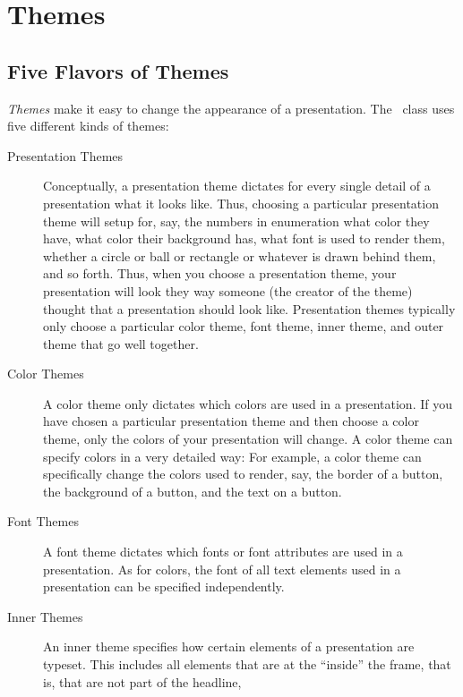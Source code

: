 
%


\section{Themes}


\subsection{Five Flavors of Themes}

\emph{Themes} make it easy to change the appearance of a
presentation. The \beamer\ class uses five different kinds of themes:
\begin{description}
\item[Presentation Themes]
  Conceptually, a presentation theme dictates for every single detail
  of a presentation what it looks like. Thus, choosing a particular
  presentation theme will setup for, say, the numbers in enumeration
  what color they have, what color their background has, what font is
  used to render them, whether a circle or ball or rectangle or
  whatever is drawn behind them, and so forth. Thus, when you choose
  a presentation theme, your presentation will look they way someone
  (the creator of the theme) thought that a presentation should look
  like. Presentation themes typically only choose a particular color
  theme, font theme, inner theme, and outer theme that go well
  together. 
\item[Color Themes]
  A color theme only dictates which colors are used in a
  presentation. If you have chosen a particular presentation theme
  and then choose a color theme, only the colors of your presentation
  will change. A color theme can specify colors in a very detailed
  way: For example, a color theme can specifically change the colors
  used to render, say, the border of a button, the background of a
  button, and the text on a button.
\item[Font Themes]
  A font theme dictates which fonts or font attributes are used in a
  presentation. As for colors, the font of all text elements used in a
  presentation can be specified independently.
\item[Inner Themes]
  An inner theme specifies how certain elements of a
  presentation are typeset. This includes all elements that are at the
  ``inside'' the frame, that is, that are not part of the headline,

\end{description}
